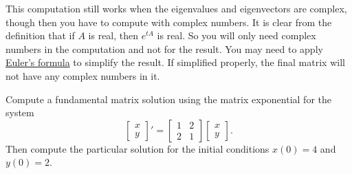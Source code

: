 \documentclass{ximera}
\begin{document}
This computation still works when the eigenvalues and eigenvectors are complex, though then you have to compute with complex numbers.  It is clear from the definition that if $A$ is real, then $e^{tA}$ is real.  So you will only need complex numbers in the computation and not for the result.  You may need to apply \hyperref[eulersformula]{Euler's formula} to simplify the result.  If simplified properly, the final matrix will not have any complex numbers in it.

\begin{example}
    Compute a fundamental matrix solution using the matrix exponential for the system
    \begin{equation*}
        \begin{bmatrix}
            x \\ 
            y
        \end{bmatrix} '
        =
        \begin{bmatrix}
            1 & 2 \\
            2 & 1
        \end{bmatrix}
        \begin{bmatrix}
            x \\ 
            y
        \end{bmatrix} .
    \end{equation*}
    Then compute the particular solution for the initial conditions $x(0) = 4$ and $y(0) = 2$.
    

\end{example}
\end{document}
